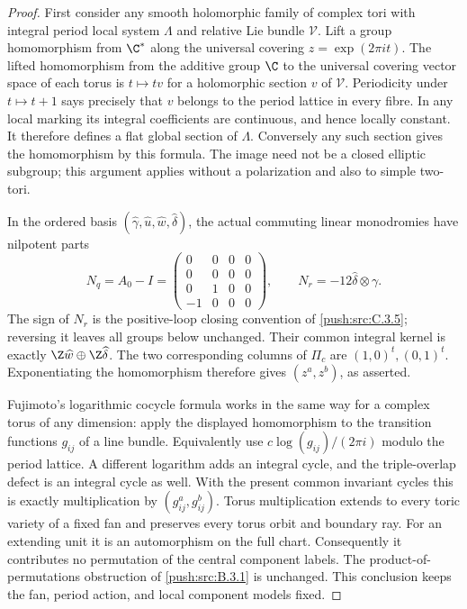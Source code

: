 \begin{proof}
First consider any smooth holomorphic family of
complex tori with integral period local system
$\Lambda$ and relative Lie bundle $\mathcal V$.
Lift a group homomorphism from $\C^*$ along the
universal covering $z=\exp(2\pi i t)$.
The lifted homomorphism from the additive group
$\C$ to the universal covering vector space of
each torus is $t\mapsto t v$ for a holomorphic
section $v$ of $\mathcal V$.  Periodicity under
$t\mapsto t+1$ says precisely that $v$ belongs
to the period lattice in every fibre.  In any
local marking its integral coefficients are
continuous, and hence locally constant.  It
therefore defines a flat global section of
$\Lambda$.  Conversely any such section gives
the homomorphism by this formula.  The image
need not be a closed elliptic subgroup; this
argument applies without a polarization and
also to simple two-tori.

In the ordered basis
$(\widehat\gamma,\widehat u,\widehat w,\widehat\delta)$,
the actual commuting linear monodromies have
nilpotent parts
\[
 N_q=A_0-I=
 \begin{pmatrix}
 0&0&0&0\\0&0&0&0\\0&1&0&0\\-1&0&0&0
 \end{pmatrix},\qquad
 N_r=-12\widehat\delta\otimes\gamma.
\]
The sign of $N_r$ is the positive-loop closing
convention of \ref{push:src:C.3.5}; reversing it leaves all
groups below unchanged.  Their common integral
kernel is exactly $\Z\widehat w\oplus\Z\widehat\delta$.
The two corresponding columns of $\Pi_c$ are
$(1,0)^t,(0,1)^t$.  Exponentiating the homomorphism
therefore gives $(z^a,z^b)$, as asserted.

Fujimoto's logarithmic cocycle formula
\citep[Definition 1.1]{Fujimoto1990AB} works in
the same way for a complex torus of any dimension:
apply the displayed homomorphism to the transition
functions $g_{ij}$ of a line bundle.  Equivalently
use $c\log(g_{ij})/(2\pi i)$ modulo the period
lattice.  A different logarithm adds an integral
cycle, and the triple-overlap defect is an
integral cycle as well.  With the present common
invariant cycles this is exactly multiplication
by $(g_{ij}^a,g_{ij}^b)$.  Torus multiplication
extends to every toric variety of a fixed fan
and preserves every torus orbit and boundary
ray.  For an extending unit it is an automorphism
on the full chart.  Consequently it contributes
no permutation of the central component labels.
The product-of-permutations obstruction of \ref{push:src:B.3.1}
is unchanged.  This conclusion keeps the fan,
period action, and local component models fixed.


\end{proof}
